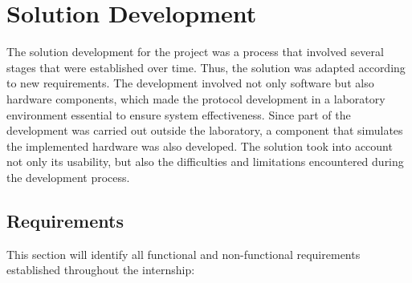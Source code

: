 \section{Solution Development}

The solution development for the project was a process that involved several stages that were established over time. Thus, the solution was adapted according to new requirements. The development involved not only software but also hardware components, which made the protocol development in a laboratory environment essential to ensure system effectiveness. Since part of the development was carried out outside the laboratory, a component that simulates the implemented hardware was also developed. The solution took into account not only its usability, but also the difficulties and limitations encountered during the development process.

\subsection{Requirements}

This section will identify all functional and non-functional requirements established throughout the internship:

